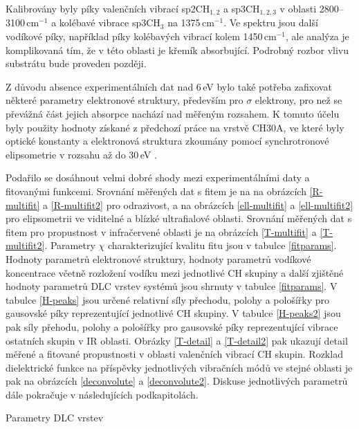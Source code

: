 Kalibrovány byly píky valenčních vibrací sp2CH$_{1,2}$ a sp3CH$_{1,2,3}$ v oblasti 2800--3100\,cm$^{-1}$ a kolébavé vibrace sp3CH$_3$ na 1375\,cm$^{-1}$. Ve spektru jsou další vodíkové píky, například píky kolébavých vibrací kolem 1450\,cm$^{-1}$, ale analýza je komplikovaná tím, že v této oblasti je křemík absorbující. Podrobný rozbor vlivu substrátu bude proveden později.

Z důvodu absence experimentálních dat nad 6\,eV bylo také potřeba zafixovat některé parametry elektronové struktury, především pro $\sigma$ elektrony, pro než se převážná část jejich absorpce nachází nad měřeným rozsahem. K tomuto účelu byly použity hodnoty získané z předchozí práce na vrstvě CH30A, ve které byly optické konstanty a elektronová struktura zkoumány pomocí synchrotronové elipsometrie v rozsahu až do 30\,eV \cite{Franta2011}.

 Podařilo se dosáhnout velmi dobré shody mezi experimentálními daty a fitovanými funkcemi. Srovnání měřených dat s fitem je na na obrázcích \ref{R-multifit} a \ref{R-multifit2} pro odrazivost, a na obrázcích \ref{ell-multifit} a \ref{ell-multifit2} pro elipsometrii ve viditelné a blízké ultrafialové oblasti.  Srovnání měřených dat s fitem pro propustnost v infračervené oblasti je na obrázcích \ref{T-multifit} a \ref{T-multifit2}. Parametry $\chi$ charakterizující kvalitu fitu jsou v tabulce \ref{fitparams}. Hodnoty parametrů elektronové struktury, hodnoty parametrů vodíkové koncentrace včetně rozložení vodíku mezi jednotlivé CH skupiny a další zjištěné hodnoty parametrů DLC vrstev systémů jsou shrnuty v tabulce \ref{fitparams}. 
V tabulce \ref{H-peaks} jsou určené relativní síly přechodu, polohy a pološířky pro gausovské píky reprezentující jednotlivé CH skupiny. V tabulce \ref{H-peaks2} jsou pak síly přehodu, polohy a pološířky pro gausovské píky reprezentující vibrace ostatních skupin v IR oblasti.
Obrázky \ref{T-detail} a \ref{T-detail2} pak ukazují detail měřené a fitované propustnosti v oblasti valenčních vibrací CH skupin. Rozklad dielektrické funkce na příspěvky jednotlivých vibračních módů ve stejné oblasti je pak na obrázcích \ref{deconvolute} a \ref{deconvolute2}. Diskuse jednotlivých parametrů dále pokračuje v následujících podkapitolách.

\begin{table}[tbhp]
 \centering
	\renewcommand{\tabcolsep}{4pt}
 
 \caption{Parametry DLC vrstev}
\label{fitparams}
\end{table}


